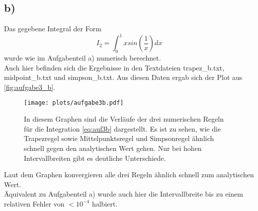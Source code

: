 \subsection{b)}
Das gegebene Integral der Form
\begin{equation}
    I_2 = \int_0^1 x sin(\frac{1}{x})dx
    \label{eq:auf3b}
\end{equation}
wurde wie im Aufgabenteil a) numerisch berechnet.\\
Auch hier befinden sich die Ergebnisse in den Textdateien trapez\_b.txt, midpoint\_b.txt und simpson\_b.txt.
Aus diesen Daten ergab sich der Plot aus \autoref{fig:aufgabe3_b}.
\begin{figure}
    \centering
    \texttt{[image: plots/aufgabe3b.pdf]}
    \caption{In diesem Graphen sind die Verläufe der drei numerischen Regeln für die Integration \ref{eq:auf3b} dargestellt.
    Es ist zu sehen, wie die Trapezregel sowie Mittelpunktsregel und Simpsonregel ähnlich schnell gegen den analytischen Wert gehen. Nur bei hohen Intervallbreiten gibt es deutliche Unterschiede.}
    \label{fig:aufgabe3_b}
\end{figure}
Laut dem Graphen konvergieren alle drei Regeln ähnlich schnell zum analytischen Wert.\\
Äquivalent zu Aufgabenteil a) wurde auch hier die Intervallbreite bis zu einem relativen Fehler von $<10^{-4}$ halbiert.